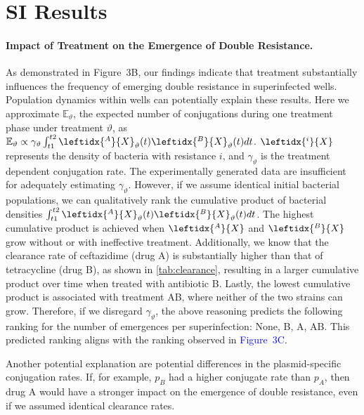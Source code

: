 \section{SI Results\label{ssec:si_results}}
\paragraph{Impact of Treatment on the Emergence of Double Resistance.}
As demonstrated in Figure~3B, our findings indicate that treatment substantially influences the frequency of emerging double resistance in superinfected wells.
Population dynamics within wells can potentially explain these results.
Here we approximate  $\mathbb{E}_\vartheta$, the expected number of conjugations during one treatment phase under treatment $\vartheta$, as
$\mathbb{E}_\vartheta \propto \gamma_\vartheta \int_{t1}^{t2} \leftidx{^A}{X}_\vartheta(t) \leftidx{^B}{X}_\vartheta(t) dt$.
$\leftidx{^i}{X}$ represents the density of bacteria with resistance $i$, and $\gamma_\vartheta$ is the treatment dependent conjugation rate.
The experimentally generated data are insufficient for adequately estimating $\gamma_\vartheta$.
However, if we assume identical initial bacterial populations, we can qualitatively rank the cumulative product of bacterial densities $\int_{t1}^{t2} \leftidx{^A}{X}_\vartheta(t) \leftidx{^B}{X}_\vartheta(t) dt$.
The highest cumulative product is achieved when $\leftidx{^A}{X}$ and $\leftidx{^B}{X}$ grow without or with ineffective treatment.
Additionally, we know that the clearance rate of ceftazidime (drug A) is substantially higher than that of tetracycline (drug B), as shown in \autoref{tab:clearance}, resulting in a larger cumulative product over time when treated with antibiotic B.
Lastly, the lowest cumulative product is associated with treatment AB, where neither of the two strains can grow.
Therefore, if we disregard $\gamma_\vartheta$, the above reasoning predicts the following ranking for the number of emergences per superinfection: None, B, A, AB.
This predicted ranking aligns with the ranking observed in \textcolor{blue}{Figure~3C}.

Another potential explanation are potential differences in the plasmid-specific conjugation rates.
If, for example, $p_B$ had a higher conjugate rate than  $p_A$, then drug A would have a stronger impact on the emergence of double resistance, even if we assumed identical clearance rates.

